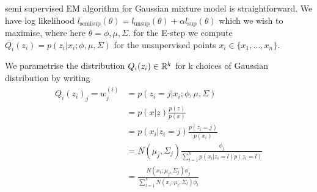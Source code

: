 %
%
\begin{answer}
semi supervised EM algorithm for Gaussian mixture model is straightforward. We have log likelihood $l_{\text{semisup}}(\theta) = l_{\text{unsup}}(\theta) + \alpha l_{\text{sup}}(\theta)$ which we wish to maximise, where here $\theta = \phi, \mu, \Sigma$. for the E-step we compute $Q_i(z_i) = p(z_i | x_i; \phi, \mu, \Sigma)$ for the unsupervised points $x_i \in \{x_1, ..., x_n\}$.

We parametrise the distribution $Q_i(z_i) \in \mathbb{R}^k$ for k choices of Gaussian distribution by writing
\begin{align*}
Q_i(z_i)_j = w^{(i)}_j
&= p(z_i = j | x_i; \phi, \mu, \Sigma)
\\
&= p(x|z) \frac{p(z)}{p(x)}
\\
&= p(x_i | z_i = j) \frac{p(z_i = j)}{p(x_i)}
\\
&= N(\mu_j, \Sigma_j) \frac{\phi_j}{\sum_{l=1}^k p(x_i | z_i = l) p(z_i = l)}
\\
&= \frac{ N(x_i; \mu_j, \Sigma_j) \phi_j}{\sum_{l=1}^k N(x_i; \mu_l, \Sigma_l) \phi_l}
\end{align*}
\end{answer}
%